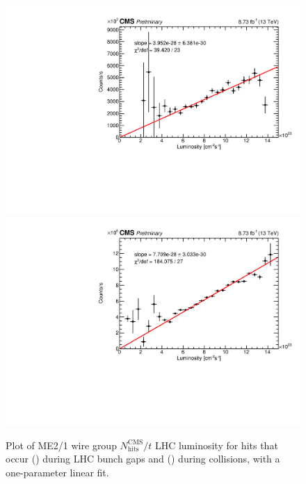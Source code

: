 \begin{figure}
	\centering
	\includegraphics[width=\dummyFigWidth]{figures/neutron/luminosity_21_wire_early_CHAM_TIME_20180416_fit.pdf}
	\includegraphics[width=\dummyFigWidth]{figures/neutron/luminosity_21_wire_total_CHAM_TIME_20180416_fit.pdf}
  \caption[Plot of ME2/1 wire group ${N}^\text{CMS}_\text{hits}/{t}$ \vs LHC luminosity for hits that occur during LHC bunch gaps and during \pp collisions.]{Plot of ME2/1 wire group ${N}^\text{CMS}_\text{hits}/{t}$ \vs LHC luminosity for hits that occur () during LHC bunch gaps and () during \pp collisions, with a one-parameter linear fit.}
	\label{fig:ME21_HvsL}
\end{figure}

